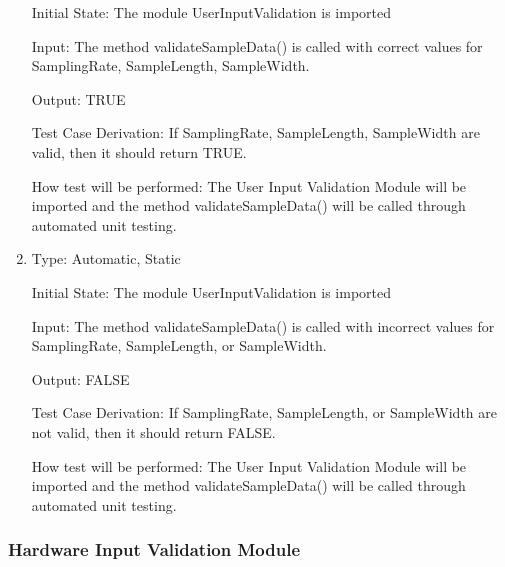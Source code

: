 \documentclass[12pt, titlepage]{article}
\begin{document}
\begin{enumerate}[{UT-UI}1.]
  Initial State: The module UserInputValidation is imported

  Input: The method validateSampleData() is called with correct values for SamplingRate, SampleLength, SampleWidth.

  Output: TRUE

  Test Case Derivation: If SamplingRate, SampleLength, SampleWidth are valid, then it should return TRUE.

  How test will be performed: The User Input Validation Module will be imported and the method validateSampleData() will be called through automated unit testing. 

  \item
  
  Type: Automatic, Static 

  Initial State: The module UserInputValidation is imported

  Input: The method validateSampleData() is called with incorrect values for SamplingRate, SampleLength, or SampleWidth.

  Output: FALSE

  Test Case Derivation: If SamplingRate, SampleLength, or SampleWidth are not valid, then it should return FALSE.

  How test will be performed: The User Input Validation Module will be imported and the method validateSampleData() will be called through automated unit testing. 
\end{enumerate}

\subsubsection{Hardware Input Validation Module }
\end{document}
